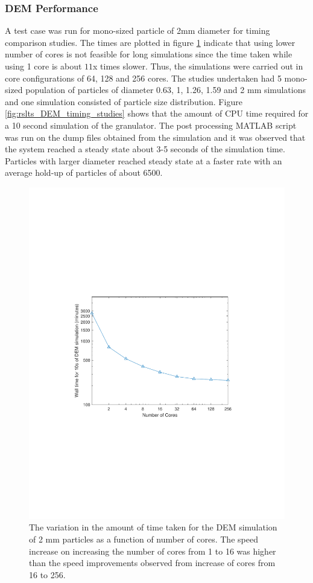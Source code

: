 \documentclass[preprint,11pt,authoryear]{elsarticle}
\begin{document}
\subsubsection{DEM Performance}
A test case was run for mono-sized particle of 2mm diameter for timing comparison studies. The 
times are plotted in figure \ref{fig:rslts_DEM_2mm_timing} indicate that using lower number of cores is 
not feasible for long simulations since the time taken while using 1 core is about $11$x times slower.
Thus, the simulations were carried out in core configurations of 64, 128 and 256 cores. The studies 
undertaken had 5 mono-sized population of particles of diameter 0.63, 1, 1.26, 1.59 and 2 mm 
simulations and one simulation consisted of particle size distribution. Figure 
\ref{fig:rslts_DEM_timing_studies} shows that the amount of CPU time required for a 10 second 
simulation of the granulator. The post processing MATLAB script was run on the dump files obtained 
from the simulation and it was observed that the system reached a steady state about 3-5 seconds of 
the simulation time. Particles with larger diameter reached steady state at a faster rate with an average 
hold-up of particles of about 6500. 
\begin{figure}
\centering
\includegraphics[scale=0.75]{rslsts_2mm_timing_mtlb.pdf}
\caption{The variation in the amount of time taken for the DEM simulation of 2 mm particles as a function of number of cores. The 
speed increase on increasing the number of cores from 1 to 16 was higher than the speed improvements observed from increase of cores 
from 16 to 256.}
\label{fig:rslts_DEM_2mm_timing}
\end{figure}	
\end{document}
